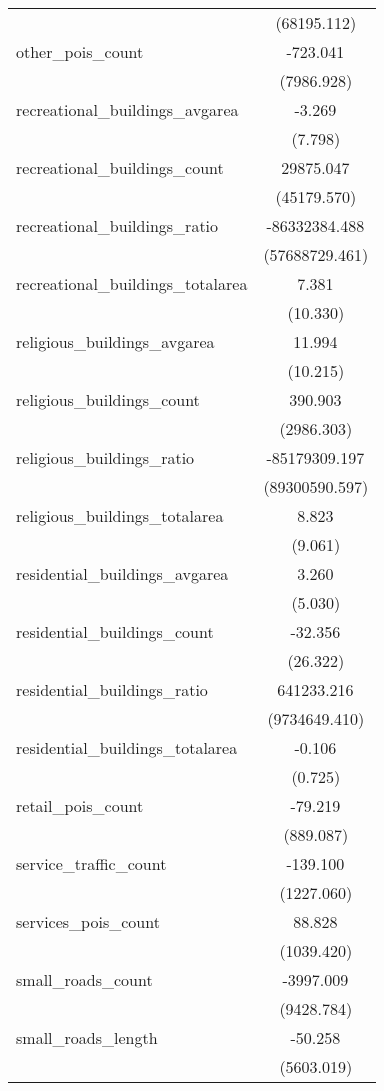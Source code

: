 \begin{table}[!htbp]
\begin{tabular}{@{\extracolsep{5pt}}lc}
  & (68195.112) \\
 other_pois_count & -723.041$^{}$ \\
  & (7986.928) \\
 recreational_buildings_avgarea & -3.269$^{}$ \\
  & (7.798) \\
 recreational_buildings_count & 29875.047$^{}$ \\
  & (45179.570) \\
 recreational_buildings_ratio & -86332384.488$^{}$ \\
  & (57688729.461) \\
 recreational_buildings_totalarea & 7.381$^{}$ \\
  & (10.330) \\
 religious_buildings_avgarea & 11.994$^{}$ \\
  & (10.215) \\
 religious_buildings_count & 390.903$^{}$ \\
  & (2986.303) \\
 religious_buildings_ratio & -85179309.197$^{}$ \\
  & (89300590.597) \\
 religious_buildings_totalarea & 8.823$^{}$ \\
  & (9.061) \\
 residential_buildings_avgarea & 3.260$^{}$ \\
  & (5.030) \\
 residential_buildings_count & -32.356$^{}$ \\
  & (26.322) \\
 residential_buildings_ratio & 641233.216$^{}$ \\
  & (9734649.410) \\
 residential_buildings_totalarea & -0.106$^{}$ \\
  & (0.725) \\
 retail_pois_count & -79.219$^{}$ \\
  & (889.087) \\
 service_traffic_count & -139.100$^{}$ \\
  & (1227.060) \\
 services_pois_count & 88.828$^{}$ \\
  & (1039.420) \\
 small_roads_count & -3997.009$^{}$ \\
  & (9428.784) \\
 small_roads_length & -50.258$^{}$ \\
  & (5603.019) \\

\end{tabular}
\end{table}
